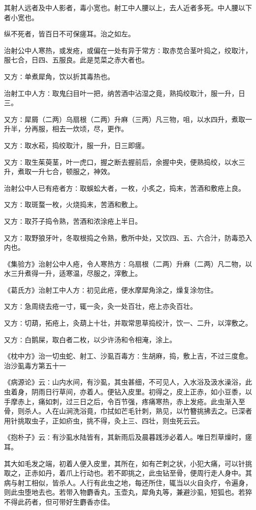 \documentclass[a4paper,12pt,UTF8,twoside]{ctexbook}
\begin{document}
其射人远者及中人影者，毒小宽也。射工中人腰以上，去人近者多死。中人腰以下者小宽也。

纵不死者，皆百日不可保瘥耳。治之如左。

治射公中人寒热，或发疮，或偏在一处有异于常方∶取赤苋合茎叶捣之，绞取汁，服七合，日四、五服良。此是苋菜之赤大者也。

又方∶单煮犀角，饮以折其毒热也。

治射工中人方∶取鬼臼目叶一把，纳苦酒中沾湿之竟，熟捣绞取汁，服一升，日三。

又方∶犀屑（二两）乌扇根（二两）升麻（三两）凡三物，咀，以水四升，煮取一升半，分再服，相去一炊顷，尽，更作。

又方∶取水菘，捣绞取汁，服一升，日三即瘥。

又方∶取生茱萸茎，叶一虎口，握之断去握前后，余握中央，便熟捣绞，以水三升，煮取一升七合，顿服之，神效。

治射公中人已有疮者方∶取蜈蚣大者，一枚，小炙之，捣末，苦酒和敷疮上良。

又方∶取斑蝥一枚，火烧捣末，苦酒和敷上。

又方∶取芥子捣令熟，苦酒和浓涂疮上半日。

又方∶取野狼牙叶，冬取根捣之令熟，敷所中处，又饮四、五、六合汁，防毒恐入内也。

《集验方》治射公中人疮，令人寒热方∶乌扇根（二两）升麻（二两）凡二物，以水三升煮得一升，适寒温，尽服之，滓敷上。

《葛氏方》治射工中人方∶初见此疮，便水摩犀角涂之，燥复涂勿住。

又方∶急周绕去疮一寸，辄一灸，灸一处百壮，疮上亦灸百壮。

又方∶切葫，拓疮上，灸葫上十壮，并取常思草捣绞汁，饮一、二升，以滓敷之。

又方∶白鹅屎，取白者二枚，以少许汤和令相淹，涂上。

《枕中方》治一切虫蛇、射工、沙虱百毒方∶生胡麻，捣，敷上吉，不过三度愈。
治沙虱毒方第五十一

《病源论》云∶山内水间，有沙虱，其虫甚细，不可见人，入水浴及汲水澡浴，此虫着身，阴雨日行草间，亦着人。便钻入皮里。初得之，皮上正赤，如小豆黍，以手摩赤上，痛如刺，过三日之后，令百节强，疼痛寒热，赤上发疮。此虫渐入至骨，则杀人。人在山涧洗浴竟，巾拭如芒毛针刺，熟见，以竹簪挑拂去之。已深者用针挑取虫子，正如疥虫，挑不得，灸上三、四壮，则虫死云云。

《抱朴子》云∶有沙虱水陆皆有，其新雨后及晨暮践涉必着人。唯日烈草燥时，瘥耳。

其大如毛发之端，初着人便入皮里，其所在，如有芒刺之状，小犯大痛，可以针挑取之，正赤如丹，着爪上行动也。若不即挑之，此虫钻至骨，便周行走人身中。其病与射工相似，皆杀人。人行有此虫之地，每还所住，辄当以火自灸疗，令遍身，则此虫堕地去也。若带入物麝香丸，玉壶丸，犀角丸等，兼避沙虱，短狐也。若猝不得此药者，但可带好生麝香亦佳。
\end{document}
